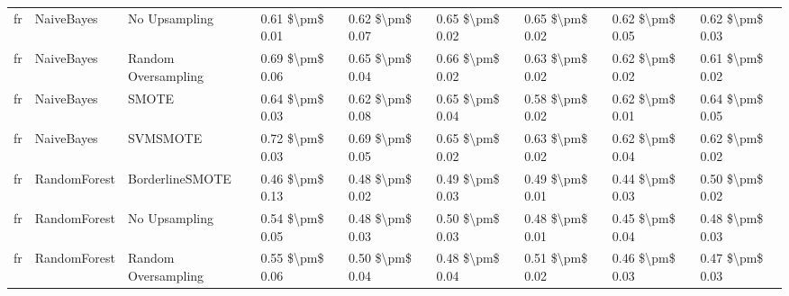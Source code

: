 \begin{tabular}{lllllllll}
      fr &                      NaiveBayes &                 No Upsampling &     0.61 \$\textbackslash pm\$ 0.01 &           0.62 \$\textbackslash pm\$ 0.07 &       0.65 \$\textbackslash pm\$ 0.02 &        0.65 \$\textbackslash pm\$ 0.02 &                         0.62 \$\textbackslash pm\$ 0.05 &     0.62 \$\textbackslash pm\$ 0.03 \\
      fr &                      NaiveBayes &           Random Oversampling &     0.69 \$\textbackslash pm\$ 0.06 &           0.65 \$\textbackslash pm\$ 0.04 &       0.66 \$\textbackslash pm\$ 0.02 &        0.63 \$\textbackslash pm\$ 0.02 &                         0.62 \$\textbackslash pm\$ 0.02 &     0.61 \$\textbackslash pm\$ 0.02 \\
      fr &                      NaiveBayes &                         SMOTE &     0.64 \$\textbackslash pm\$ 0.03 &           0.62 \$\textbackslash pm\$ 0.08 &       0.65 \$\textbackslash pm\$ 0.04 &        0.58 \$\textbackslash pm\$ 0.02 &                         0.62 \$\textbackslash pm\$ 0.01 &     0.64 \$\textbackslash pm\$ 0.05 \\
      fr &                      NaiveBayes &                      SVMSMOTE &     0.72 \$\textbackslash pm\$ 0.03 &           0.69 \$\textbackslash pm\$ 0.05 &       0.65 \$\textbackslash pm\$ 0.02 &        0.63 \$\textbackslash pm\$ 0.02 &                         0.62 \$\textbackslash pm\$ 0.04 &     0.62 \$\textbackslash pm\$ 0.02 \\
      fr &                    RandomForest &               BorderlineSMOTE &     0.46 \$\textbackslash pm\$ 0.13 &           0.48 \$\textbackslash pm\$ 0.02 &       0.49 \$\textbackslash pm\$ 0.03 &        0.49 \$\textbackslash pm\$ 0.01 &                         0.44 \$\textbackslash pm\$ 0.03 &     0.50 \$\textbackslash pm\$ 0.02 \\
      fr &                    RandomForest &                 No Upsampling &     0.54 \$\textbackslash pm\$ 0.05 &           0.48 \$\textbackslash pm\$ 0.03 &       0.50 \$\textbackslash pm\$ 0.03 &        0.48 \$\textbackslash pm\$ 0.01 &                         0.45 \$\textbackslash pm\$ 0.04 &     0.48 \$\textbackslash pm\$ 0.03 \\
      fr &                    RandomForest &           Random Oversampling &     0.55 \$\textbackslash pm\$ 0.06 &           0.50 \$\textbackslash pm\$ 0.04 &       0.48 \$\textbackslash pm\$ 0.04 &        0.51 \$\textbackslash pm\$ 0.02 &                         0.46 \$\textbackslash pm\$ 0.03 &     0.47 \$\textbackslash pm\$ 0.03 \\

\end{tabular}
